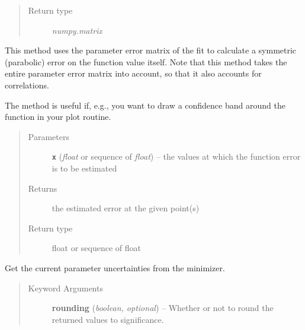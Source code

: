 \documentclass[a4paper,10pt,english]{sphinxmanual}
\begin{document}
\begin{fulllineitems}
\begin{fulllineitems}
\begin{quote}
\begin{description}
\item[{Return type}] \leavevmode
\emph{numpy.matrix}

\end{description}\end{quote}

\end{fulllineitems}


\begin{fulllineitems}
\label{module_doc:kafe.fit.Fit.get_function_error}
This method uses the parameter error matrix of the fit to calculate
a symmetric (parabolic) error on the function value itself. Note that
this method takes the entire parameter error matrix into account, so
that it also accounts for correlations.

The method is useful if, e.g., you want to draw a confidence band
around the function in your plot routine.
\begin{quote}\begin{description}
\item[{Parameters}] \leavevmode
\textbf{\texttt{x}} (\emph{float} or sequence of \emph{float}) -- the values at which the function error is to be estimated

\item[{Returns}] \leavevmode
the estimated error at the given point(s)

\item[{Return type}] \leavevmode
float or sequence of float

\end{description}\end{quote}

\end{fulllineitems}


\begin{fulllineitems}
\label{module_doc:kafe.fit.Fit.get_parameter_errors}
Get the current parameter uncertainties from the minimizer.
\begin{quote}\begin{description}
\item[{Keyword Arguments}] \leavevmode
\textbf{rounding} (\emph{boolean, optional}) --
Whether or not to round the returned values to significance.


\end{description}
\end{quote}
\end{fulllineitems}
\end{fulllineitems}
\end{document}
